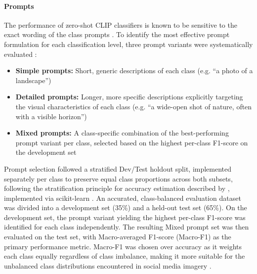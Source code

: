 \documentclass[hidelinks, 11pt]{article}
\begin{document}
\paragraph{Prompts}
The performance of zero-shot CLIP classifiers is known to be sensitive to the exact wording of the class prompts \citep{yong_prompt_2023, malla_enhancing_2025, liao_mapping_2025}. To identify the most effective prompt formulation for each classification level, three prompt variants were systematically evaluated \citep{ liao_mapping_2025}:
\begin{itemize}
\item \textbf{Simple prompts:} Short, generic descriptions of each class (e.g. ``a photo of a landscape'')
\item \textbf{Detailed prompts:} Longer, more specific descriptions explicitly targeting the visual characteristics of each class (e.g. ``a wide-open shot of nature, often with a visible horizon'')
\item \textbf{Mixed prompts:} A class-specific combination of the best-performing prompt variant per class, selected based on the highest per-class F1-score on the development set
\end{itemize}
Prompt selection followed a stratified Dev/Test holdout split, implemented separately per class to preserve equal class proportions across both subsets, following the stratification principle for accuracy estimation
described by \citet{kohavi_study_1995}, implemented via scikit-learn \citep{pedregosa_scikit-learn_2011}. An accurated, class-balanced evaluation dataset was divided into a development set (35\%) and a held-out test set (65\%). On the development set, the prompt variant yielding the highest per-class F1-score was identified for each class independently. The resulting Mixed prompt set was then evaluated on the test set, with Macro-averaged F1-score (Macro-F1) as the primary performance metric. Macro-F1 was chosen over accuracy as it weights each class equally regardless of class imbalance, making it more suitable for the unbalanced
class distributions encountered in social media imagery
\citep{liao_mapping_2025, sokolova_systematic_2009}.
\end{document}
